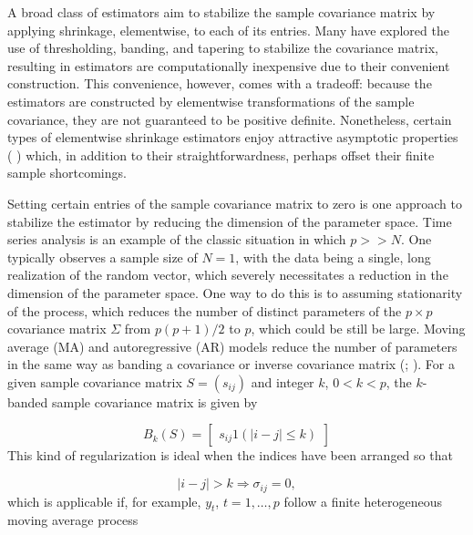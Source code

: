 A broad class of estimators aim to stabilize the sample covariance matrix by applying shrinkage, elementwise, to each of its entries. Many have explored the use of thresholding, banding, and tapering to stabilize the covariance matrix, resulting in estimators are computationally inexpensive due to their convenient construction. This convenience, however, comes with a tradeoff: because the estimators are constructed by elementwise transformations of the sample covariance, they are not guaranteed to be positive definite.  Nonetheless, certain types of elementwise shrinkage estimators enjoy attractive asymptotic properties ( \citep{bickel2008regularized} ) which, in addition to their straightforwardness, perhaps  offset their finite sample shortcomings. 

\bigskip
 
Setting certain entries of the sample covariance matrix to zero is one approach to stabilize the estimator by reducing the dimension of the parameter space. Time series analysis is an example of the classic situation in which $p >> N$. One typically observes a sample size of $N = 1$, with the data being a single, long realization of the random vector, which severely necessitates a reduction in the dimension of the parameter space. One way to do this is to assuming stationarity of the process, which reduces the number of distinct parameters of the $p \times p$ covariance matrix $\Sigma$ from $p\left(p + 1\right)/2$ to $p$, which could be still be large. Moving average (MA) and autoregressive (AR) models reduce the number of parameters in the same way as banding a covariance or inverse covariance matrix (\citep{bickel2008regularized}; \citep{wu2009banding}). For a given sample covariance matrix $S = \left(s_{ij} \right)$ and integer $k$, $0 < k < p$, the $k$-banded sample covariance matrix is given by

\begin{equation} \label{eq:general-banded-estimator} 
B_k\left(S\right) = \begin{bmatrix} s_{ij} 1\left(\vert i-j \vert \le k\right) \end{bmatrix}
\end{equation}
\noindent
This kind of regularization is ideal when the indices have been arranged so that

\[
\vert i -  j\vert > k \Rightarrow  \sigma_{ij} = 0,
\]
which is applicable if, for example, $y_t$, $t = 1, \dots,p$ follow a finite heterogeneous moving average process

